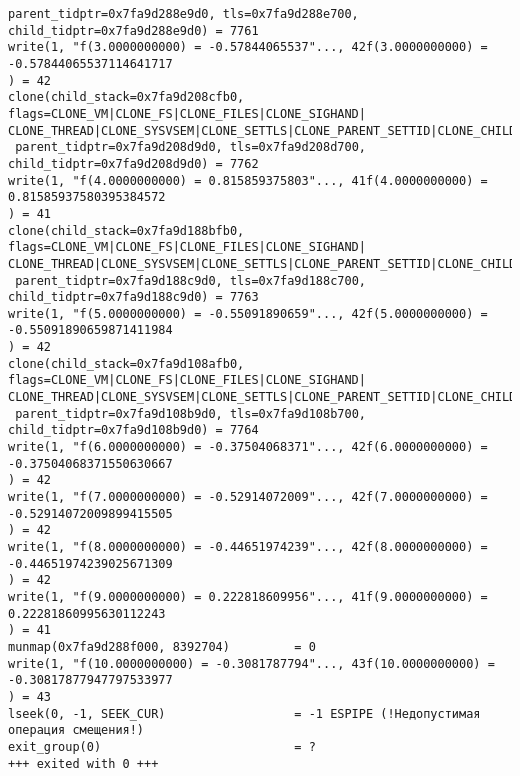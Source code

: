 \documentclass[12pt]{article}
\begin{document}
{\begin{lstlisting}[escapechar=!]
 parent_tidptr=0x7fa9d288e9d0, tls=0x7fa9d288e700, child_tidptr=0x7fa9d288e9d0) = 7761
write(1, "f(3.0000000000) = -0.57844065537"..., 42f(3.0000000000) = -0.57844065537114641717
) = 42
clone(child_stack=0x7fa9d208cfb0, flags=CLONE_VM|CLONE_FS|CLONE_FILES|CLONE_SIGHAND|
CLONE_THREAD|CLONE_SYSVSEM|CLONE_SETTLS|CLONE_PARENT_SETTID|CLONE_CHILD_CLEARTID,
 parent_tidptr=0x7fa9d208d9d0, tls=0x7fa9d208d700, child_tidptr=0x7fa9d208d9d0) = 7762
write(1, "f(4.0000000000) = 0.815859375803"..., 41f(4.0000000000) = 0.81585937580395384572
) = 41
clone(child_stack=0x7fa9d188bfb0, flags=CLONE_VM|CLONE_FS|CLONE_FILES|CLONE_SIGHAND|
CLONE_THREAD|CLONE_SYSVSEM|CLONE_SETTLS|CLONE_PARENT_SETTID|CLONE_CHILD_CLEARTID,
 parent_tidptr=0x7fa9d188c9d0, tls=0x7fa9d188c700, child_tidptr=0x7fa9d188c9d0) = 7763
write(1, "f(5.0000000000) = -0.55091890659"..., 42f(5.0000000000) = -0.55091890659871411984
) = 42
clone(child_stack=0x7fa9d108afb0, flags=CLONE_VM|CLONE_FS|CLONE_FILES|CLONE_SIGHAND|
CLONE_THREAD|CLONE_SYSVSEM|CLONE_SETTLS|CLONE_PARENT_SETTID|CLONE_CHILD_CLEARTID,
 parent_tidptr=0x7fa9d108b9d0, tls=0x7fa9d108b700, child_tidptr=0x7fa9d108b9d0) = 7764
write(1, "f(6.0000000000) = -0.37504068371"..., 42f(6.0000000000) = -0.37504068371550630667
) = 42
write(1, "f(7.0000000000) = -0.52914072009"..., 42f(7.0000000000) = -0.52914072009899415505
) = 42
write(1, "f(8.0000000000) = -0.44651974239"..., 42f(8.0000000000) = -0.44651974239025671309
) = 42
write(1, "f(9.0000000000) = 0.222818609956"..., 41f(9.0000000000) = 0.22281860995630112243
) = 41
munmap(0x7fa9d288f000, 8392704)         = 0
write(1, "f(10.0000000000) = -0.3081787794"..., 43f(10.0000000000) = -0.30817877947797533977
) = 43
lseek(0, -1, SEEK_CUR)                  = -1 ESPIPE (!Недопустимая операция смещения!)
exit_group(0)                           = ?
+++ exited with 0 +++
\end{lstlisting}}
\end{document}
